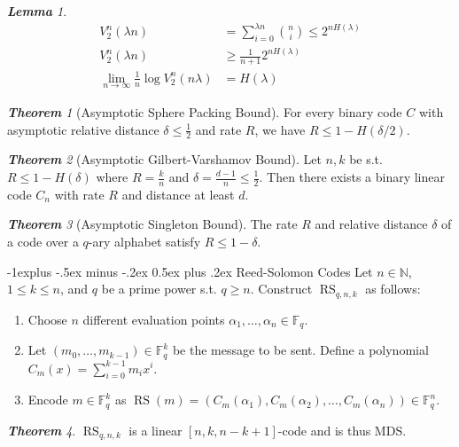 \documentclass[frenchspacing,9pt,landscape,a4paper]{article}
\makeatletter
\renewcommand{\subsection}{\@startsection{subsection}{2}{0mm}%
                                {-1explus -.5ex minus -.2ex}%
                                {0.5ex plus .2ex}%
                                {\normalfont\normalsize\bfseries}}
\newcommand{\BF}{\mathbb F}
\newcommand{\BN}{\mathbb N}
\DeclareMathOperator{\RS}{RS}
\theoremstyle{remark}
\newtheorem*{thm}{\textbf{Theorem}}
\newtheorem*{lem}{\textbf{Lemma}}
\makeatother
\begin{document}
\begin{multicols}{4}
\begin{lem}
\begin{align*}
        V_2^n(\lambda n)&=\sum_{i=0}^{\lambda n}\binom{n}{i}\leq 2^{nH(\lambda)}\\
        V_2^n(\lambda n)&\geq \frac{1}{n+1}2^{nH(\lambda)}\\
        \lim_{n\to\infty} \frac{1}{n}\log V_2^n(n\lambda)&=H(\lambda)
    \end{align*}
\end{lem}
\begin{thm}[Asymptotic Sphere Packing Bound]
    For every binary code $C$ with asymptotic relative distance  $\delta\leq \frac{1}{2}$ and rate $R$, we
    have  $R\leq 1-H(\delta /2)$.
\end{thm}
\begin{thm}[Asymptotic Gilbert-Varshamov Bound]
    Let $n,k$ be s.t.  $R\leq 1-H(\delta)$ where  $R= \frac{k}{n}$ and $\delta= \frac{d-1}{n}\leq
    \frac{1}{2}$. Then there exists a binary linear code $C_n$ with rate  $R$ and distance at least  $d$.
\end{thm}
\begin{thm}[Asymptotic Singleton Bound]
    The rate $R$ and relative distance  $\delta$ of a code over a  $q$-ary alphabet satisfy  $R\leq
    1-\delta$.
\end{thm}
\subsection{Reed-Solomon Codes}
Let $n\in\BN$,  $1\leq k\leq n$, and $q$ be a prime power s.t. $q\geq n$. Construct $\RS_{q,n,k}$ as
follows:
\begin{enumerate}
    \item Choose $n$ different evaluation points  $\alpha_1,\dots,\alpha_n\in\BF_q$.
    \item Let $(m_0,\dots,m_{k-1})\in\BF_q^k$ be the message to be sent. Define a polynomial
        $C_m(x)=\sum_{i=0}^{k-1}m_ix^i$.
    \item Encode $m\in\BF_q^k$ as  $\RS(m)=(C_m(\alpha_1),C_m(\alpha_2),\dots,C_m(\alpha_n))\in\BF_q^n$.
\end{enumerate}
\begin{thm}
    $\RS_{q,n,k}$ is a linear $[n,k,n-k+1]$-code and is thus MDS.
\end{thm}

\end{multicols}
\end{document}
